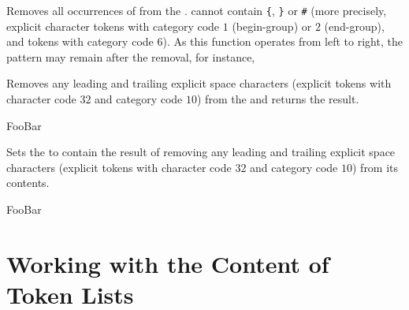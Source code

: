 \documentclass[oneside]{book}
\let\tn=\cs
\begin{document}
\begin{function}{\TlVarRemoveAll}
\begin{syntax}
  
\end{syntax}
Removes all occurrences of  from the
.  cannot contain \verb|{|, \verb|}| or \verb|#|
(more precisely, explicit character tokens with category code $1$
(begin-group) or $2$ (end-group), and tokens with category code $6$).
As this function
operates from left to right, the pattern 
may remain after the removal, for instance,
\begin{demohigh}
\TlSet {}
\TlVarRemoveAll {}
\TlUse \lTmpaTl
\end{demohigh}
\end{function}

\begin{function}{\TlTrimSpaces}
\begin{syntax}
 
\end{syntax}
Removes any leading and trailing explicit space characters
(explicit tokens with character code $32$ and category code $10$)
from the  and returns the result.
\begin{demohigh}
FooBar
\end{demohigh}
\end{function}

\begin{function}{\TlVarTrimSpaces}
\begin{syntax}
 
\end{syntax}
Sets the  to contain the result of removing any leading
and trailing explicit space characters (explicit tokens with
character code $32$ and category code $10$) from its contents.
\begin{demohigh}
\TlSet {}
\TlVarTrimSpaces \lTmpaTl
Foo\TlUse \lTmpaTl Bar
\end{demohigh}
\end{function}

\section{Working with the Content of Token Lists}
\end{document}
